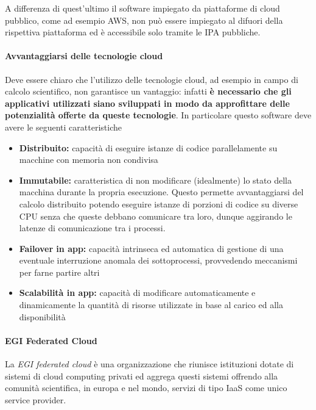 \documentclass[italian,]{article}
\providecommand{\tightlist}{%
  \setlength{\itemsep}{0pt}\setlength{\parskip}{0pt}}
\let\oldparagraph\paragraph
\renewcommand{\paragraph}[1]{\oldparagraph{#1}\mbox{}}
\begin{document}
A differenza di quest'ultimo il software impiegato da piattaforme di
cloud pubblico, come ad esempio AWS, non può essere impiegato al difuori
della rispettiva piattaforma ed è accessibile solo tramite le IPA
pubbliche.

\paragraph{Avvantaggiarsi delle tecnologie
cloud}\label{avvantaggiarsi-delle-tecnologie-cloud}

Deve essere chiaro che l'utilizzo delle tecnologie cloud, ad esempio in
campo di calcolo scientifico, non garantisce un vantaggio: infatti
\textbf{è necessario che gli applicativi utilizzati siano sviluppati in
modo da approfittare delle potenzialità offerte da queste tecnologie}.
In particolare questo software deve avere le seguenti caratteristiche

\begin{itemize}
\tightlist
\item
  \textbf{Distribuito:} capacità di eseguire istanze di codice
  parallelamente su macchine con memoria non condivisa
\item
  \textbf{Immutabile:} caratteristica di non modificare (idealmente) lo
  stato della macchina durante la propria esecuzione. Questo permette
  avvantaggiarsi del calcolo distribuito potendo eseguire istanze di
  porzioni di codice su diverse CPU senza che queste debbano comunicare
  tra loro, dunque aggirando le latenze di comunicazione tra i processi.
\item
  \textbf{Failover in app:} capacità intrinseca ed automatica di
  gestione di una eventuale interruzione anomala dei sottoprocessi,
  provvedendo meccanismi per farne partire altri
\item
  \textbf{Scalabilità in app:} capacità di modificare automaticamente e
  dinamicamente la quantità di risorse utilizzate in base al carico ed
  alla disponibilità
\end{itemize}

\paragraph{EGI Federated Cloud}\label{egi-federated-cloud}

La \emph{EGI federated cloud} è una organizzazione che riunisce
istituzioni dotate di sistemi di cloud computing privati ed aggrega
questi sistemi offrendo alla comunità scientifica, in europa e nel
mondo, servizi di tipo IaaS come unico service provider.
\end{document}
